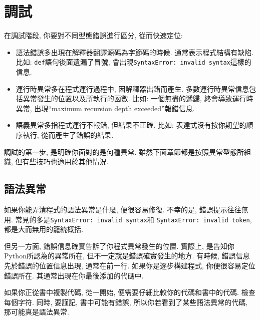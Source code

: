\documentclass[10pt]{book}
\begin{document}
\appendix

\chapter{調試}

在調試階段, 你要對不同型態錯誤進行區分, 從而快速定位:

\begin{itemize}

\item 語法錯誤多出現在解釋器翻譯源碼為字節碼的時候. 
通常表示程式結構有缺陷. 
比如: {\tt def}語句後面遺漏了冒號, 會出現{\tt SyntaxError: invalid syntax}這樣的信息.

\item 運行時異常多在程式運行過程中, 因解釋器出錯而產生. 
多數運行時異常信息包括異常發生的位置以及所執行的函數. 
比如: 一個無盡的遞歸, 終會導致運行時異常, 出現``maximum recursion depth exceeded''報錯信息.

\item 語義異常多指程式運行不報錯, 但結果不正確.
比如: 表達式沒有按你期望的順序執行, 從而產生了錯誤的結果.

\end{itemize}

調試的第一步, 是明確你面對的是何種異常. 
雖然下面章節都是按照異常型態所組織, 但有些技巧也適用於其他情況. 


\section{語法異常}

如果你能弄清程式的語法異常是什麼, 便很容易修復. 
不幸的是, 錯誤提示往往無用. 常見的多是{\tt SyntaxError: invalid syntax}和
{\tt SyntaxError: invalid token}, 都是大而無用的籠統概括. 

但另一方面, 錯誤信息確實告訴了你程式異常發生的位置. 
實際上, 是告知你Python所認為的異常所在, 但不一定就是錯誤確實發生的地方. 
有時候, 錯誤信息先於錯誤的位置信息出現, 通常在前一行. 
如果你是逐步構建程式, 你便很容易定位錯誤所在. 其通常出現在你最後添加的代碼中. 

如果你正從書中複製代碼, 從一開始, 便需要仔細比較你的代碼和書中的代碼. 
檢查每個字符. 同時, 要謹記, 書中可能有錯誤, 所以你若看到了某些語法異常的代碼, 
那可能真是語法異常. 
\end{document}
